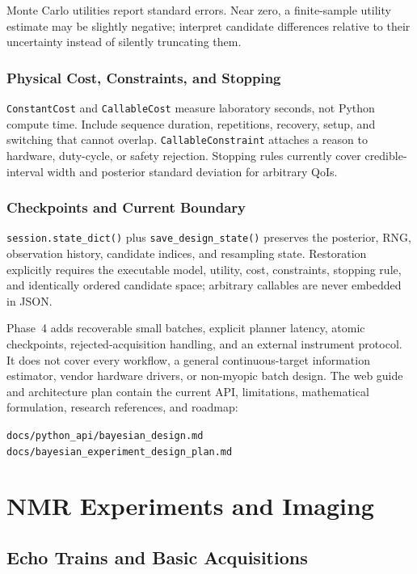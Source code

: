 \documentclass[11pt,oneside]{report}
\newcommand{\code}[1]{\texttt{#1}}
\begin{document}
Monte Carlo utilities report standard errors. Near zero, a finite-sample
utility estimate may be slightly negative; interpret candidate differences
relative to their uncertainty instead of silently truncating them.

\section{Physical Cost, Constraints, and Stopping}

\code{ConstantCost} and \code{CallableCost} measure laboratory seconds, not
Python compute time. Include sequence duration, repetitions, recovery, setup,
and switching that cannot overlap. \code{CallableConstraint} attaches a reason
to hardware, duty-cycle, or safety rejection. Stopping rules currently cover
credible-interval width and posterior standard deviation for arbitrary QoIs.

\section{Checkpoints and Current Boundary}

\code{session.state\_dict()} plus \code{save\_design\_state()} preserves the
posterior, RNG, observation history, candidate indices, and resampling state.
Restoration explicitly requires the executable model, utility, cost,
constraints, stopping rule, and identically ordered candidate space; arbitrary
callables are never embedded in JSON.

Phase~4 adds recoverable small batches, explicit planner latency, atomic
checkpoints, rejected-acquisition handling, and an external instrument
protocol. It does not cover every workflow, a general continuous-target
information estimator, vendor hardware drivers, or non-myopic batch design.
The web guide and architecture plan contain the current API,
limitations, mathematical formulation, research references, and roadmap:
\begin{center}
\code{docs/python\_api/bayesian\_design.md}\\
\code{docs/bayesian\_experiment\_design\_plan.md}
\end{center}

\part{NMR Experiments and Imaging}
\label{part:nmr-experiments}

\chapter{Echo Trains and Basic Acquisitions}
\label{chap:workflows}
\end{document}
